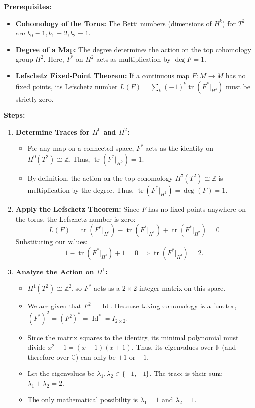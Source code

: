 \begin{solution}
\textbf{Prerequisites:}
\begin{itemize}
    \item \textbf{Cohomology of the Torus:} The Betti numbers (dimensions of $H^k$) for $T^2$ are $b_0 = 1, b_1 = 2, b_2 = 1$.
    \item \textbf{Degree of a Map:} The degree determines the action on the top cohomology group $H^2$. Here, $F^*$ on $H^2$ acts as multiplication by $\deg F = 1$.
    \item \textbf{Lefschetz Fixed-Point Theorem:} If a continuous map $F: M \to M$ has no fixed points, its Lefschetz number $L(F) = \sum_{k} (-1)^k \operatorname{tr}(F^* |_{H^k})$ must be strictly zero.
\end{itemize}

\medskip
\textbf{Steps:}
\begin{enumerate}
    \item \textbf{Determine Traces for $H^0$ and $H^2$:} 
    \begin{itemize}
        \item For any map on a connected space, $F^*$ acts as the identity on $H^0(T^2) \cong \mathbb{Z}$. Thus, $\operatorname{tr}(F^* |_{H^0}) = 1$.
        \item By definition, the action on the top cohomology $H^2(T^2) \cong \mathbb{Z}$ is multiplication by the degree. Thus, $\operatorname{tr}(F^* |_{H^2}) = \deg(F) = 1$.
    \end{itemize}

    \item \textbf{Apply the Lefschetz Theorem:}
    Since $F$ has no fixed points anywhere on the torus, the Lefschetz number is zero:
    \[
    L(F) = \operatorname{tr}(F^* |_{H^0}) - \operatorname{tr}(F^* |_{H^1}) + \operatorname{tr}(F^* |_{H^2}) = 0
    \]
    Substituting our values:
    \[
    1 - \operatorname{tr}(F^* |_{H^1}) + 1 = 0 \implies \operatorname{tr}(F^* |_{H^1}) = 2.
    \]

    \item \textbf{Analyze the Action on $H^1$:}
    \begin{itemize}
        \item $H^1(T^2) \cong \mathbb{Z}^2$, so $F^*$ acts as a $2 \times 2$ integer matrix on this space.
        \item We are given that $F^2 = \operatorname{Id}$. Because taking cohomology is a functor, $(F^*)^2 = (F^2)^* = \operatorname{Id}^* = I_{2 \times 2}$.
        \item Since the matrix squares to the identity, its minimal polynomial must divide $x^2 - 1 = (x-1)(x+1)$. Thus, its eigenvalues over $\mathbb{R}$ (and therefore over $\mathbb{C}$) can only be $+1$ or $-1$.
        \item Let the eigenvalues be $\lambda_1, \lambda_2 \in \{+1, -1\}$. The trace is their sum: $\lambda_1 + \lambda_2 = 2$.
        \item The only mathematical possibility is $\lambda_1 = 1$ and $\lambda_2 = 1$.
    \end{itemize}


\end{enumerate}
\end{solution}
